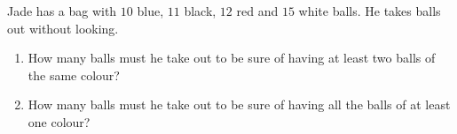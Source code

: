 Jade has a bag with $10$ blue, $11$ black, $12$ red and $15$ white balls. He takes balls out without looking.
\begin{enumerate}
\item[(a)] How many balls must he take out to be sure of having at least two balls of the same colour?
\item[(b)] How many balls must he take out to be sure of having all the balls of at least one colour?
\end{enumerate}
